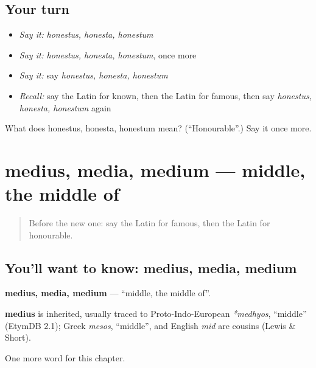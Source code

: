 \subsection*{Your turn}
\begin{itemize}
\raggedright
  \item \emph{Say it:} \emph{honestus, honesta, honestum}
  \item \emph{Say it:} \emph{honestus, honesta, honestum}, once more
  \item \emph{Say it:} say \emph{honestus, honesta, honestum}
  \item \emph{Recall:} say the Latin for known, then the Latin for famous, then say \emph{honestus, honesta, honestum} again
\end{itemize}

\begin{tcolorbox}[breakable,colback=teal!4,colframe=teal!35!black,title={Before you move on}]
What does honestus, honesta, honestum mean? (\textquotedblleft{}Honourable\textquotedblright{}.) Say it once more.
\end{tcolorbox}
\section[medius, media, medium]{medius, media, medium — middle, the middle of}

\label{lesson:LA-C183-medius}



\begin{quote}
Before the new one: say the Latin for famous, then the Latin for honourable.
\end{quote}

\subsection*{You'll want to know: medius, media, medium}
\textbf{medius, media, medium} — \textquotedblleft{}middle, the middle of\textquotedblright{}.

\begin{cousinweb}
\textbf{medius} is inherited, usually traced to Proto-Indo-European \emph{*medhyos}, \textquotedblleft{}middle\textquotedblright{} (EtymDB 2.1); Greek \emph{mesos}, \textquotedblleft{}middle\textquotedblright{}, and English \emph{mid} are cousins (Lewis \& Short).
\end{cousinweb}

\begin{grammarlens}[title={What you've built}]
One more word for this chapter.
\end{grammarlens}

